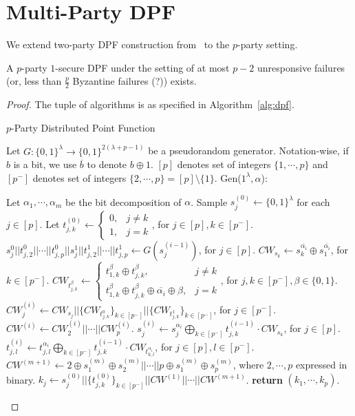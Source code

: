 \documentclass[11pt]{article}
\newcommand{\Gen}{\textsf{Gen}}
\begin{document}
\section{Multi-Party DPF}
We extend two-party DPF construction from~\cite{bgi18} to the $p$-party setting.
\begin{theorem}
A $p$-party $1$-secure DPF under the setting of at most $p-2$ unresponsive failures (or, less than $\frac{p}{2}$ Byzantine failures (?)) exists.
\end{theorem}
\begin{proof}
The tuple of algorithms is as specified in Algorithm~\ref{alg:dpf}.



\begin{algorithm}
\caption{$p$-Party Distributed Point Function}\label{alg:dpf}
Let $G : \{0,1\}^\lambda \to \{0,1\}^{2(\lambda + p - 1)}$ be a pseudorandom generator. Notation-wise, if $b$ is a bit, we use $\overline{b}$ to denote $b \oplus 1$. $[p]$ denotes set of integers $\{1, \cdots, p\}$ and $[p^-]$ denotes set of integers $\{2, \cdots, p\} = [p] \setminus \{1\}$.
\vspace{10px}
\newline
\Gen($1^\lambda, \alpha$):
\begin{algorithmic}[1]
\State Let $\alpha_1, \cdots, \alpha_m$ be the bit decomposition of $\alpha$.
\State Sample $s_j^{(0)} \leftarrow \{0,1\}^{\lambda}$ for each $j \in [p]$.
\State Let $t_{j,k}^{(0)} \leftarrow \begin{cases} 0, & j \neq k\\ 1, & j = k\end{cases}$, for $j \in [p], k \in [p^-]$.
\State $s_j^0||t_{j,2}^0||\cdots||t_{j,p}^0||s_j^{1}||t_{j,2}^1||\cdots||t_{j,p}^1 \leftarrow G(s_j^{(i-1)})$, for $j \in [p]$.
\State $CW_{s_k} \leftarrow s_k^{\overline{\alpha_i}} \oplus s_1^{\overline{\alpha_i}}$, for $k \in [p^-]$.
\State $CW_{t_{j,k}^\beta} \leftarrow \begin{cases} t_{1,k}^\beta \oplus t_{j,k}^\beta, & j \neq k \\ t^\beta_{1,k} \oplus t^\beta_{j,k} \oplus \overline{\alpha_i} \oplus \beta, & j = k\end{cases}$, for $j,k \in [p^-], \beta \in \{0,1\}$.
\State $CW^{(i)}_j \leftarrow CW_{s_j}||\{CW_{t_{j,k}^0}\}_{k \in [p^-]}||\{CW_{t_{j,k}^1}\}_{k \in [p^-]}$, for $j \in [p^-]$.
\State $CW^{(i)} \leftarrow CW_2^{(i)} || \cdots || CW_p^{(i)}$.
\State $s_j^{(i)} \leftarrow s_j^{\alpha_i} \bigoplus_{k \in [p^-]} t_{j,k}^{(i-1)} \cdot CW_{s_k}$, for $j \in [p]$.
\State $t_{j,l}^{(i)} \leftarrow t_{j,l}^{\alpha_i} \bigoplus_{k \in [p^-]} t_{j,k}^{(i-1)} \cdot CW_{t_{k,l}^{\alpha_i}}$, for $j \in [p], l \in [p^-]$.
\EndFor
\State $CW^{(m+1)} \leftarrow 2 \oplus s_1^{(m)} \oplus s_2^{(m)} || \cdots || p \oplus s_1^{(m)} \oplus s_p^{(m)}$, where $2, \cdots, p$ expressed in binary.
\State $k_j \leftarrow s_j^{(0)}||\{t_{j,k}^{(0)}\}_{k \in [p^-]}||CW^{(1)}||\cdots||CW^{(m+1)}$.
\State \textbf{return} $(k_1, \cdots, k_p)$.
\end{algorithmic}


\end{algorithm}
\end{proof}
\end{document}
